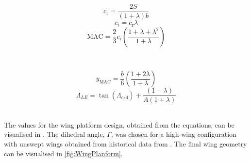 \begin{minipage}{.45\linewidth}
    \begin{equation}
        \label{eq:rootcrd}
        c_\text{r} = \frac{2S}{(1+\lambda)b}
    \end{equation}
    \begin{equation}
        \label{eq:tipcrd}
        c_\text{t} = c_\text{r} \lambda
    \end{equation}
    \begin{equation}
        \label{eq:MAC}
        \mathrm{MAC} = \frac{2}{3}c_\text{r} \left( \frac{1+\lambda+\lambda^2}{1+\lambda} \right)
    \end{equation}
    
\end{minipage}
~
\begin{minipage}{.45\linewidth}
    
    \begin{equation}
        \label{eq:ymac}
        y_\mathrm{MAC} = \frac{b}{6} \left( \frac{1+2\lambda}{1+\lambda}\right )
    \end{equation} 
    \begin{equation}
    \label{Sweep_LE}
        \Lambda_{LE} = \tan(\Lambda_{c/4}) + \frac{(1-\lambda)}{A(1+\lambda)}
    \end{equation}
\end{minipage}\\

The values for the wing platform design, obtained from the equations, can be visualised in .
The dihedral angle, $\Gamma$, was chosen for a high-wing configuration with unswept wings obtained from historical data from \textcite{raymer1992aircraft}. The final wing geometry can be visualised in \cref{fig:WingPlanform}.



